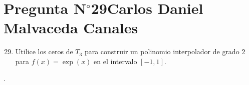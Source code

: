 \section{Pregunta N$^{\circ}$29\qquad Carlos Daniel Malvaceda Canales}

\begin{frame}
	\begin{enumerate}\setcounter{enumi}{28}
		\item

		      Utilice los ceros de $T_{3}$ para construir un polinomio
		      interpolador de grado $2$ para
		      $f\left(x\right)=\exp\left(x\right)$ en el intervalo
		      $\left[-1,1\right]$.
	\end{enumerate}

	\begin{solution}
		.
	\end{solution}
\end{frame}
